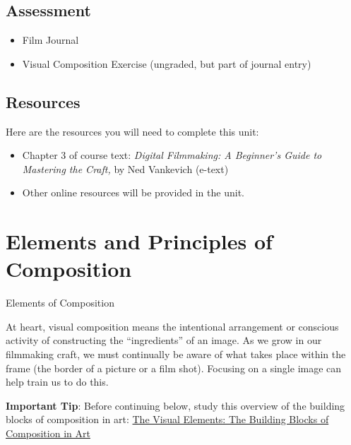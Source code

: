 \documentclass[
]{book}
\providecommand{\tightlist}{%
  \setlength{\itemsep}{0pt}\setlength{\parskip}{0pt}}
\begin{document}
\hypertarget{assessment-4}{%
\subsection*{Assessment}\label{assessment-4}}

\begin{itemize}
\tightlist
\item
  Film Journal\\
\item
  Visual Composition Exercise (ungraded, but part of journal entry)
\end{itemize}

\hypertarget{resources-2}{%
\subsection*{Resources}\label{resources-2}}

Here are the resources you will need to complete this unit:

\begin{itemize}
\tightlist
\item
  Chapter 3 of course text: \emph{Digital Filmmaking: A Beginner's Guide to Mastering the Craft,} by Ned Vankevich (e-text)
\item
  Other online resources will be provided in the unit.
\end{itemize}

\hypertarget{elements-and-principles-of-composition}{%
\section{Elements and Principles of Composition}\label{elements-and-principles-of-composition}}

{Elements of Composition}

At heart, visual composition means the intentional arrangement or conscious activity of constructing the ``ingredients'' of an image. As we grow in our filmmaking craft, we must continually be aware of what takes place within the frame (the border of a picture or a film shot). Focusing on a single image can help train us to do this.

\begin{caution}
\textbf{Important Tip}: Before continuing below, study this overview of the building blocks of composition in art: \href{http://www.artyfactory.com/art_appreciation/visual-elements/visual-elements.html}{The Visual Elements: The Building Blocks of Composition in Art}
\end{caution}
\end{document}
